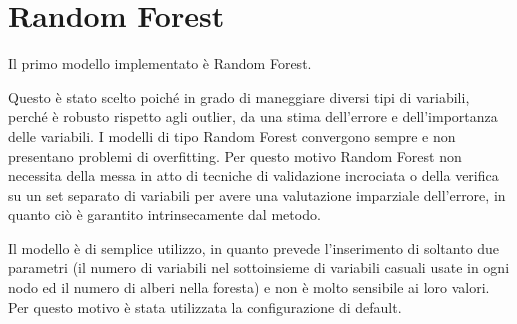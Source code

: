 \section{Random Forest}
Il primo modello implementato è Random Forest.

Questo è stato scelto poiché in grado di maneggiare diversi tipi di variabili, 
perché è robusto rispetto agli outlier, da una stima dell'errore e 
dell'importanza delle variabili. 
I modelli di tipo Random Forest convergono sempre e non presentano problemi di 
overfitting. Per questo motivo Random Forest non necessita della messa in atto 
di tecniche di validazione incrociata o della verifica su un set separato di 
variabili per avere una valutazione imparziale dell'errore, in quanto ciò è 
garantito intrinsecamente dal metodo.

Il modello è di semplice utilizzo, in quanto prevede l’inserimento di soltanto 
due parametri (il numero di variabili nel sottoinsieme di variabili casuali 
usate in ogni nodo ed il numero di alberi nella foresta) e non è molto 
sensibile ai loro valori. Per questo motivo è stata utilizzata la 
configurazione di default.
